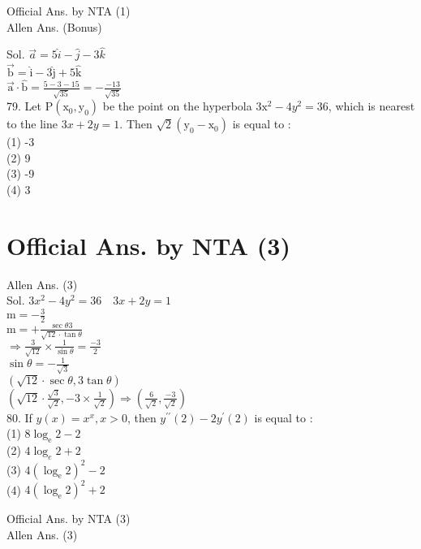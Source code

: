 \documentclass[10pt]{article}
\begin{document}
Official Ans. by NTA (1)\\
Allen Ans. (Bonus)

Sol. \(\vec{a}=5 \hat{i}-\hat{j}-3 \hat{k}\)\\
\(\overrightarrow{\mathrm{b}}=\hat{\mathrm{i}}-3 \hat{\mathrm{j}}+5 \hat{\mathrm{k}}\)\\
\(\overrightarrow{\mathrm{a}} \cdot \hat{\mathrm{b}}=\frac{5-3-15}{\sqrt{35}}=-\frac{-13}{\sqrt{35}}\)\\
79. Let \(\mathrm{P}\left(\mathrm{x}_{0}, \mathrm{y}_{0}\right)\) be the point on the hyperbola \(3 \mathrm{x}^{2}- 4 y^{2}=36\), which is nearest to the line \(3 x+2 y=1\). Then \(\sqrt{2}\left(\mathrm{y}_{0}-\mathrm{x}_{0}\right)\) is equal to :\\
(1) -3\\
(2) 9\\
(3) -9\\
(4) 3

\section*{Official Ans. by NTA (3)}
Allen Ans. (3)\\
Sol. \(3 x^{2}-4 y^{2}=36 \quad 3 x+2 y=1\)\\
\(\mathrm{m}=-\frac{3}{2}\)\\
\(\mathrm{m}=+\frac{\sec \theta 3}{\sqrt{12} \cdot \tan \theta}\)\\
\(\Rightarrow \frac{3}{\sqrt{12}} \times \frac{1}{\sin \theta}=\frac{-3}{2}\)\\
\(\sin \theta=-\frac{1}{\sqrt{3}}\)\\
\((\sqrt{12} \cdot \sec \theta, 3 \tan \theta)\)\\
\(\left(\sqrt{12} \cdot \frac{\sqrt{3}}{\sqrt{2}},-3 \times \frac{1}{\sqrt{2}}\right) \Rightarrow\left(\frac{6}{\sqrt{2}}, \frac{-3}{\sqrt{2}}\right)\)\\
80. If \(y(x)=x^{x}, x>0\), then \(y^{\prime \prime}(2)-2 y^{\prime}(2)\) is equal to :\\
(1) \(8 \log _{\mathrm{e}} 2-2\)\\
(2) \(4 \log _{e} 2+2\)\\
(3) \(4\left(\log _{\mathrm{e}} 2\right)^{2}-2\)\\
(4) \(4\left(\log _{\mathrm{e}} 2\right)^{2}+2\)

Official Ans. by NTA (3)\\
Allen Ans. (3)
\end{document}
